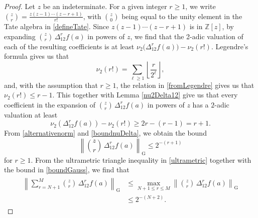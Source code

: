 \documentclass[11pt,letterpaper]{amsart}
\begin{document}
\begin{proof}
 Let $z$ be an indeterminate. For a given integer $r \geq 1$, we write $\binom{z}{r} = \frac{z(z-1) \cdots (z-r + 1)}{r!}$, with 
 $\binom{z}{0}$ being equal to the unity element in the Tate algebra in \eqref{defineTate}. Since $z (z-1) \cdots (z - r + 1)$ is in 
 $\mathbb{Z}[z]$, by expanding $ \binom{z}{r} \, \Delta_{12}^{r} f(a)$ in powers of $z$, 
 we find that the 2-adic valuation of each of the resulting coefficients
 is at least $\nu_2\big( \Delta_{12}^{r} f(a) \big) - \nu_2(r!)$. 
 Legendre's formula gives us that 
\begin{equation}\label{fromLegendre} 
 \nu_2(r!) = \sum_{\ell \geq 1} \left\lfloor \frac{r}{2^{\ell}} \right\rfloor, 
\end{equation}
 and, with the assumption that $r \geq 1$, the relation in  \eqref{fromLegendre} gives us that  $\nu_{2}(r!) \leq r - 1$. This together with 
 Lemma \ref{nu2Delta12} give us that every coefficient in  the expansion of  $ \binom{z}{r} \, \Delta_{12}^{r} f(a)$ in powers of $z$  has a 
 $2$-adic valuation at least 
\begin{equation}\label{boundnuDelta}
 \nu_{2}\left( \Delta_{12}^{r} f(a) \right) - \nu_{2}(r!)
 \geq 2 r - (r-1) = r + 1.
\end{equation}
 From \eqref{alternativenorm} and \eqref{boundnuDelta}, we obtain the bound 
\begin{equation}\label{boundGauss}
 \left\| \binom{z}{r} \, \Delta_{12}^{r} f(a) \right\|_{\operatorname{G}} \leq 2^{-(r+1)} 
\end{equation}
 for $r \geq 1$.
 From the ultrametric triangle inequality in \eqref{ultrametric}
 together with the bound in \eqref{boundGauss}, we find that 
\begin{align}
\begin{split}
 \left\| \sum_{r=N+1}^{M} \binom{z}{r} \, \Delta_{12}^{r} f(a) \right\|_{\operatorname{G}}
 & \leq \max_{N+1 \leq r \leq M} \left\| \binom{z}{r} \, \Delta_{12}^{r} f(a) \right\|_{\operatorname{G}} \\ 
 & \leq 2^{-(N+2)}. 
\end{split}\label{givesCauchy}
\end{align}


\end{proof}
\end{document}
